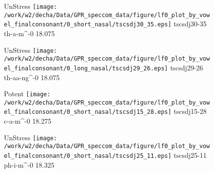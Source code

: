 \documentclass{article}
\begin{document}
\begin{figure}[t]
\begin{minipage}[b]{.24\textwidth}
UnStress
\centering
\texttt{[image: /work/w2/decha/Data/GPR\_speccom\_data/figure/lf0\_plot\_by\_vowel\_finalconsonant/0\_short\_nasal/tscsdj30\_35.eps]}
tscsdj30-35 th-a-m\textasciicircum-0 18.075
\end{minipage}
\begin{minipage}[b]{.24\textwidth}
UnStress
\centering
\texttt{[image: /work/w2/decha/Data/GPR\_speccom\_data/figure/lf0\_plot\_by\_vowel\_finalconsonant/0\_long\_nasal/tscsdj29\_26.eps]}
tscsdj29-26 th-aa-ng\textasciicircum-0 18.075
\end{minipage}
\begin{minipage}[b]{.24\textwidth}
\colorbox{Apricot}{Potent}
\centering
\texttt{[image: /work/w2/decha/Data/GPR\_speccom\_data/figure/lf0\_plot\_by\_vowel\_finalconsonant/0\_short\_nasal/tscsdj15\_28.eps]}
tscsdj15-28 c-a-m\textasciicircum-0 18.275
\end{minipage}
\begin{minipage}[b]{.24\textwidth}
UnStress
\centering
\texttt{[image: /work/w2/decha/Data/GPR\_speccom\_data/figure/lf0\_plot\_by\_vowel\_finalconsonant/0\_short\_nasal/tscsdj25\_11.eps]}
tscsdj25-11 ph-i-m\textasciicircum-0 18.325
\end{minipage}
\end{figure}
\end{document}
